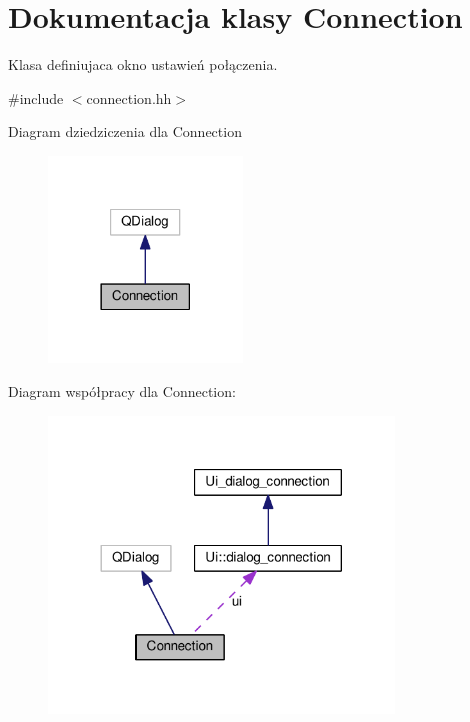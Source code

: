 \hypertarget{class_connection}{}\section{Dokumentacja klasy Connection}
\label{class_connection}


Klasa definiujaca okno ustawień połączenia.  




{\ttfamily \#include $<$connection.\+hh$>$}



Diagram dziedziczenia dla Connection\nopagebreak
\begin{figure}[H]
\begin{center}
\leavevmode
\includegraphics[width=146pt]{class_connection__inherit__graph}
\end{center}
\end{figure}


Diagram współpracy dla Connection\+:\nopagebreak
\begin{figure}[H]
\begin{center}
\leavevmode
\includegraphics[width=260pt]{class_connection__coll__graph}
\end{center}
\end{figure}
